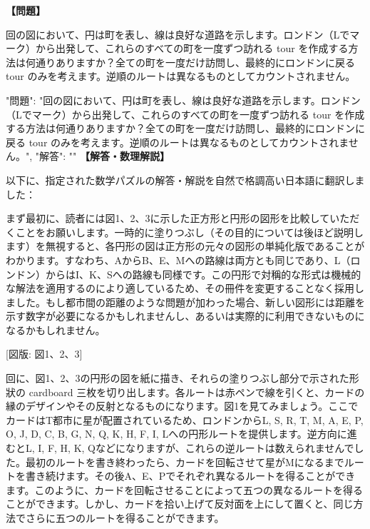 \documentclass[10pt,a4paper,oneside,openany]{ltjsbook}
\begin{document}
\begin{tcolorbox}[colback=softblue,colframe=primaryblue,title=\textbf{第 254 問：THE MOTOR-CAR TOUR.},arc=2mm,boxrule=1pt,breakable]
\textbf{【問題】}\par\vspace{0.3em}
回の図において、円は町を表し、線は良好な道路を示します。ロンドン（Lでマーク）から出発して、これらのすべての町を一度ずつ訪れる tour を作成する方法は何通りありますか？全ての町を一度だけ訪問し、最終的にロンドンに戻る tour のみを考えます。逆順のルートは異なるものとしてカウントされません。

{
  "問題": "回の図において、円は町を表し、線は良好な道路を示します。ロンドン（Lでマーク）から出発して、これらのすべての町を一度ずつ訪れる tour を作成する方法は何通りありますか？全ての町を一度だけ訪問し、最終的にロンドンに戻る tour のみを考えます。逆順のルートは異なるものとしてカウントされません。",
  "解答": ""
}
\tcblower
\textbf{【解答・数理解説】}\par\vspace{0.3em}
以下に、指定された数学パズルの解答・解説を自然で格調高い日本語に翻訳しました：

まず最初に、読者には図1、2、3に示した正方形と円形の図形を比較していただくことをお願いします。一時的に塗りつぶし（その目的については後ほど説明します）を無視すると、各円形の図は正方形の元々の図形の単純化版であることがわかります。すなわち、AからB、E、Mへの路線は両方とも同じであり、L（ロンドン）からはI、K、Sへの路線も同様です。この円形で対稱的な形式は機械的な解法を適用するのにより適しているため、その冊件を変更することなく採用しました。もし都市間の距離のような問題が加わった場合、新しい図形には距離を示す数字が必要になるかもしれませんし、あるいは実際的に利用できないものになるかもしれません。

[図版: 図1、2、3]

回に、図1、2、3の円形の図を紙に描き、それらの塗りつぶし部分で示された形狀の cardboard 三枚を切り出します。各ルートは赤ペンで線を引くと、カードの縁のデザインやその反射となるものになります。図1を見てみましょう。ここでカードはT都市に星が配置されているため、ロンドンからL, S, R, T, M, A, E, P, O, J, D, C, B, G, N, Q, K, H, F, I, Lへの円形ルートを提供します。逆方向に進むとL, I, F, H, K, Qなどになりますが、これらの逆ルートは数えられませんでした。最初のルートを書き終わったら、カードを回転させて星がMになるまでルートを書き続けます。その後A、E、Pでそれぞれ異なるルートを得ることができます。このように、カードを回転させることによって五つの異なるルートを得ることができます。しかし、カードを拾い上げて反対面を上にして置くと、同じ方法でさらに五つのルートを得ることができます。


\end{tcolorbox}
\end{document}
